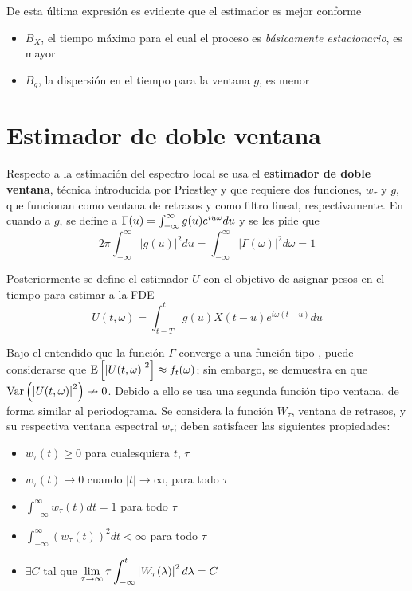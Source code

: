De esta última expresión es evidente que el estimador es mejor conforme 
\begin{itemize}
\item  $B_X$, el tiempo máximo para el cual el proceso es \textit{básicamente estacionario}, es 
mayor
\item $B_g$, la dispersión en el tiempo para la ventana $g$, es menor
\end{itemize}


\section{Estimador de doble ventana}

Respecto a la estimación del espectro local se usa el \textbf{estimador de doble ventana}, 
técnica introducida por Priestley \cite{Priestley69} y que requiere dos funciones, $w_\tau$ y 
$g$, que funcionan como ventana de retrasos y como filtro lineal, respectivamente.
%
En cuando a $g$, se define a $\Gamma(u) = \int_{-\infty}^{\infty} g(u) e^{i u \omega} du$ y se les pide que
\begin{equation*}
2\pi \int_{-\infty}^{\infty} \lvert g(u) \lvert^{2} du 
= 
\int_{-\infty}^{\infty} \lvert \Gamma(\omega) \lvert^{2} d\omega
= 1
\end{equation*}

Posteriormente se define el estimador $U$ con el objetivo de asignar pesos en el tiempo para estimar
a la FDE
\begin{equation*}
U(t,\omega) = \int_{t-T}^{t} g(u) X({t-u}) e^{i \omega (t-u)} du
\end{equation*}

Bajo el entendido que la función $\Gamma$ converge a una función tipo \dirac, puede 
considerarse que 
$\mathrm{E}\left[ \left| U(t,\omega) \right|^{2} \right] \approx f_t(\omega)$; sin embargo, se demuestra en \cite{Priestley66} 
que $\mathrm{Var}\left( \left| U(t,\omega) \right|^{2} \right) \nrightarrow 0$.
%
Debido a ello se usa una segunda función tipo ventana,
de forma similar al periodograma.
Se considera la función $W_\tau$, ventana de retrasos, y su respectiva ventana espectral 
$w_\tau$; deben satisfacer las siguientes propiedades:
\begin{itemize}
\item $w_{\tau}(t) \geq 0$ para cualesquiera $t$, $\tau$
\item $w_{\tau}(t) \rightarrow 0$ cuando $\lvert t \lvert \rightarrow \infty$, para todo $\tau$
\item $\displaystyle \int_{-\infty}^{\infty} w_{\tau}(t) dt = 1$ para todo $\tau$
\item $\displaystyle \int_{-\infty}^{\infty} \left( w_{\tau}(t) \right)^{2} dt < \infty$ para todo $\tau$
\item $\exists C$ tal que  
$\displaystyle \lim_{\tau\rightarrow\infty} \tau \int_{-\infty}^{t} \left|  W_{\tau}(\lambda)  \right|^{2} d\lambda = C$
\end{itemize}

